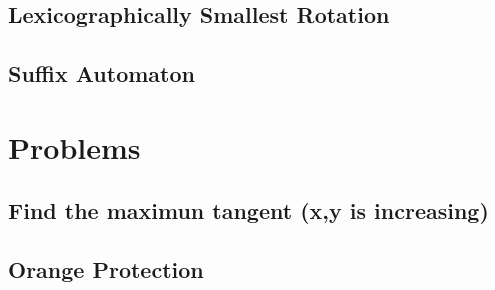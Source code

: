 \documentclass[10pt,twocolumn,oneside]{article}
\begin{document}
\subsection{Lexicographically Smallest Rotation}


\subsection{Suffix Automaton}


\section{Problems}
%

\subsection{Find the maximun tangent (x,y is increasing)}


%

\subsection{Orange Protection}


%
\end{document}
